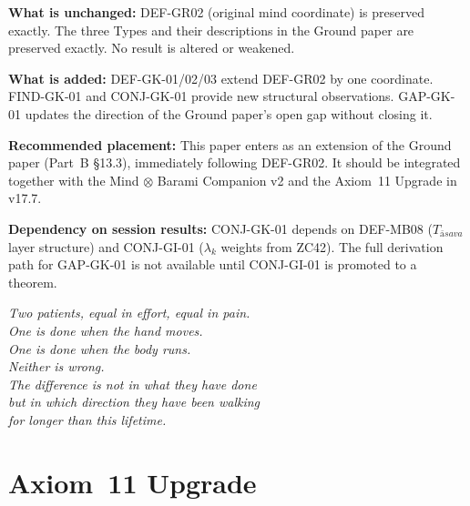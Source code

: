 \documentclass[12pt, a4paper]{article}
\providecommand{\Tasava}{T_{\bar{\mathrm{a}}sava}}
\providecommand{\Tasava}{\mathcal{T}_{\!\mathrm{\bar{a}sava}}}
\begin{document}

\begin{keybox}[title={Placement in CRF Complete Edition}]
\textbf{What is unchanged:}
DEF-GR02 (original mind coordinate) is preserved exactly.
The three Types and their descriptions in the Ground paper
are preserved exactly. No result is altered or weakened.

\textbf{What is added:}
DEF-GK-01/02/03 extend DEF-GR02 by one coordinate.
FIND-GK-01 and CONJ-GK-01 provide new structural observations.
GAP-GK-01 updates the direction of the Ground paper's
open gap without closing it.

\textbf{Recommended placement:}
This paper enters as an extension of the Ground paper
(Part~B §13.3), immediately following DEF-GR02.
It should be integrated together with the Mind $\otimes$
Barami Companion v2 and the Axiom~11 Upgrade in v17.7.

\textbf{Dependency on session results:}
CONJ-GK-01 depends on DEF-MB08 ($\Tasava$ layer structure)
and CONJ-GI-01 ($\lambda_k$ weights from ZC42). The full
derivation path for GAP-GK-01 is not available until
CONJ-GI-01 is promoted to a theorem.
\end{keybox}

\bigskip
\begin{center}
\textit{Two patients, equal in effort, equal in pain.\\
One is done when the hand moves.\\
One is done when the body runs.\\[0.4em]
Neither is wrong.\\
The difference is not in what they have done\\
but in which direction they have been walking\\
for longer than this lifetime.}
\end{center}





\newpage

\part{Axiom~11 Upgrade}
\label{part:xxxiii}
\end{document}
